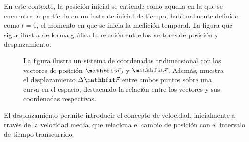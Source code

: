 En este contexto, la posición inicial se entiende como aquella en la que se encuentra la partícula en un instante inicial de tiempo, habitualmente definido como $t=0$, el momento en que se inicia la medición temporal. La figura que sigue ilustra de forma gráfica la relación entre los vectores de posición y desplazamiento.

\begin{figure}
    \centering
    \caption{La figura ilustra un sistema de coordenadas tridimensional con los vectores de posición $\vecr_0$ y $\vecr$. Además, muestra el desplazamiento $\Deltar$ entre ambos puntos sobre una curva en el espacio, destacando la relación entre los vectores y sus coordenadas respectivas.}
    \label{fig:desplazamiento}
\end{figure}

El desplazamiento permite introducir el concepto de velocidad, inicialmente a través de la velocidad media, que relaciona el cambio de posición con el intervalo de tiempo transcurrido.

